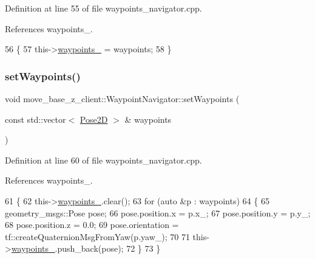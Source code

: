 Definition at line 55 of file waypoints\+\_\+navigator.\+cpp.



References waypoints\+\_\+.


\begin{DoxyCode}
56 \{
57   this->\hyperlink{classmove__base__z__client_1_1WaypointNavigator_a83e4e39987eaf1c8856d32d581eb4cd0}{waypoints\_} = waypoints;
58 \}
\end{DoxyCode}
\mbox{\label{classmove__base__z__client_1_1WaypointNavigator_a8844f85f9c953c34025db8ada4709e59}} 
\subsubsection{\texorpdfstring{set\+Waypoints()}{setWaypoints()}\hspace{0.1cm}{\footnotesize\ttfamily [2/2]}}
{\footnotesize\ttfamily void move\+\_\+base\+\_\+z\+\_\+client\+::\+Waypoint\+Navigator\+::set\+Waypoints (\begin{DoxyParamCaption}\item[{const std\+::vector$<$ \hyperlink{structmove__base__z__client_1_1Pose2D}{Pose2D} $>$ \&}]{waypoints }\end{DoxyParamCaption})}



Definition at line 60 of file waypoints\+\_\+navigator.\+cpp.



References waypoints\+\_\+.


\begin{DoxyCode}
61 \{
62   this->\hyperlink{classmove__base__z__client_1_1WaypointNavigator_a83e4e39987eaf1c8856d32d581eb4cd0}{waypoints\_}.clear();
63   \textcolor{keywordflow}{for} (\textcolor{keyword}{auto} &p : waypoints)
64   \{
65     geometry\_msgs::Pose pose;
66     pose.position.x = p.x\_;
67     pose.position.y = p.y\_;
68     pose.position.z = 0.0;
69     pose.orientation = tf::createQuaternionMsgFromYaw(p.yaw\_);
70 
71     this->\hyperlink{classmove__base__z__client_1_1WaypointNavigator_a83e4e39987eaf1c8856d32d581eb4cd0}{waypoints\_}.push\_back(pose);
72   \}
73 \}
\end{DoxyCode}



